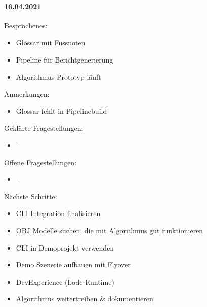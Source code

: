 \paragraph{16.04.2021}
Besprochenes:
\begin{itemize}
  \item Glossar mit Fussnoten
  \item Pipeline für Berichtgenerierung
  \item Algorithmus Prototyp läuft
\end{itemize}
Anmerkungen:
\begin{itemize}
  \item Glossar fehlt in Pipelinebuild
\end{itemize}
Geklärte Fragestellungen:
\begin{itemize}
  \item -
\end{itemize}
Offene Fragestellungen:
\begin{itemize}
  \item -
\end{itemize}
Nächste Schritte:
\begin{itemize}
  \item CLI Integration finalisieren
  \item OBJ Modelle suchen, die mit Algorithmus gut funktionieren
  \item CLI in Demoprojekt verwenden
  \item Demo Szenerie aufbauen mit Flyover
  \item DevExperience (Lode-Runtime)
  \item Algorithmus weitertreiben \& dokumentieren
\end{itemize}

\newpage

